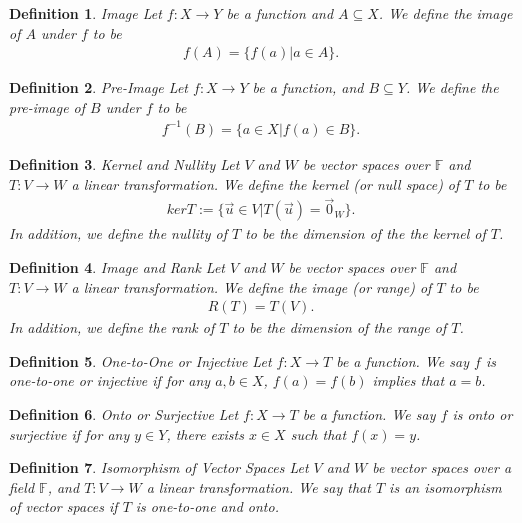 \documentclass[12pt,answers]{exam}
\newcommand{\F}{\mathbb{F}}
\newtheorem{definition}{Definition}[section]
\begin{document}
\begin{definition}{Image}
Let $f:X\rightarrow Y$ be a function and $A\subseteq X$. We define the image of $A$ under $f$ to be
\begin{align*}
	f(A)=\{f(a)|a\in A\}.
\end{align*}
\end{definition}

\begin{definition}{Pre-Image}
Let $f:X\rightarrow Y$ be a function, and $B\subseteq Y$. We define the pre-image of $B$ under $f$ to be
\begin{align*}
	f^{-1}(B)=\{a\in X|f(a)\in B\}.
\end{align*}
\end{definition}

\begin{definition}{Kernel and Nullity}
Let $V$ and $W$ be vector spaces over $\F$ and $T:V\rightarrow W$ a linear transformation. We define the kernel (or null space) of $T$ to be
\begin{align*}
	kerT:=\{\vec{u}\in V|T(\vec{u})=\vec{0}_W\}.
\end{align*}
In addition, we define the nullity of $T$ to be the dimension of the the kernel of $T$. 
\end{definition}

\begin{definition}{Image and Rank}
Let $V$ and $W$ be vector spaces over $\F$ and $T:V\rightarrow W$ a linear transformation. We define the image (or range) of $T$ to be
\begin{align*}
	R(T)=T(V).
\end{align*}
In addition, we define the rank of $T$ to be the dimension of the range of $T$. 
\end{definition}

\begin{definition}{One-to-One or Injective}
Let $f:X\rightarrow T$ be a function. We say $f$ is one-to-one or injective if for any $a,b\in X$, $f(a)=f(b)$ implies that $a=b$.
\end{definition}

\begin{definition}{Onto or Surjective}
Let $f:X\rightarrow T$ be a function. We say $f$ is onto or surjective if for any $y\in Y$, there exists $x\in X$ such that $f(x)=y$.
\end{definition}

\begin{definition}{Isomorphism of Vector Spaces}
Let $V$ and $W$ be vector spaces over a field $\F$, and $T:V\rightarrow W$ a linear transformation. We say that $T$ is an isomorphism of vector spaces if $T$ is one-to-one and onto.
\end{definition}
\end{document}
